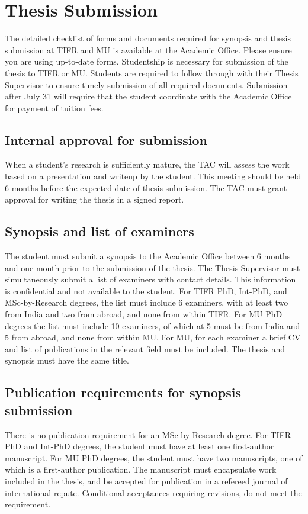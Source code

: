 \documentclass[a4paper,10pt]{article}
\begin{document}
\section{Thesis Submission}
The detailed checklist of forms and documents required for synopsis and thesis submission
at TIFR and MU is available at the Academic Office. Please ensure you are using up-to-date
forms. Studentship is necessary for submission of the thesis to TIFR or MU. Students are
required to follow through with their Thesis Supervisor to ensure timely submission of all
required documents. Submission after July 31 will require that the student coordinate with
the Academic Office for payment of tuition fees.

\subsection{Internal approval for submission} 
When a student’s research is
sufficiently mature, the TAC will assess the work based on a presentation and
writeup by the student. This meeting should be held 6 months before the expected
date of thesis submission. The TAC must grant approval for writing the thesis in
a signed report.

\subsection{Synopsis and list of examiners} 
The student must submit a synopsis to the Academic
Office between 6 months and one month prior to the submission of the thesis. The Thesis
Supervisor must simultaneously submit a list of examiners with contact details. This
information is confidential and not available to the student. For TIFR PhD, Int-PhD, and
MSc-by-Research degrees, the list must include 6 examiners, with at least two from India
and two from abroad, and none from within TIFR. For MU PhD degrees the list must
include 10 examiners, of which at 5 must be from India and 5 from abroad, and none from
within MU. For MU, for each examiner a brief CV and list of publications in the relevant
field must be included. The thesis and synopsis must have the same title.

\subsection{Publication requirements for synopsis submission}
There is no publication requirement
for an MSc-by-Research degree. For TIFR PhD and Int-PhD degrees, the student must have
at least one first-author manuscript. For MU PhD degrees, the student must have two
manuscripts, one of which is a first-author publication. The manuscript must encapsulate
work included in the thesis, and be accepted for publication in a refereed journal of
international repute. Conditional acceptances requiring revisions, do not meet the
requirement.
\end{document}
